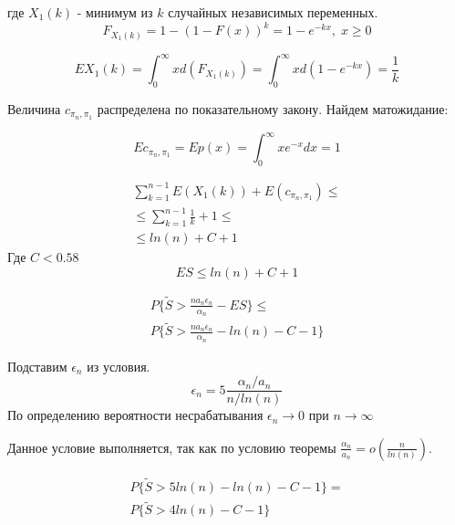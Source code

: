 \documentclass[a4paper, 14pt]{extarticle}
\numberwithin{equation}{section}
\begin{document}
где $X_1(k)$ - минимум из $k$ случайных независимых переменных.
\begin{equation}
F_{X_1(k)} = 1 - (1-F(x))^k = 1 - e^{-kx}, \; x \geq 0
\end{equation}

\begin{equation}
EX_1(k) = \int_0^\infty xd(F_{X_1(k)}) =\int_0^\infty xd(1-e^{-kx}) = \frac{1}{k}
\end{equation}

Величина $c_{\pi_n, \pi_1}$ распределена по показательному закону. Найдем матожидание:

\begin{equation}
Ec_{\pi_n, \pi_1} = Ep(x) = \int_0^\infty xe^{-x}dx = 1
\end{equation}

\begin{equation}
\begin{aligned}
\sum_{k=1}^{n-1} E(X_1(k)) + E(c_{\pi_n, \pi_1}) \leq \\
 \leq \sum_{k=1}^{n-1} \frac{1}{k} + 1 \leq \\
 \leq ln(n) + C + 1
\end{aligned}
\end{equation}
Где $C < 0.58$
\begin{equation}
ES \leq ln(n) + C + 1
\end{equation}

\begin{equation}
\begin{aligned}
P\{\tilde{S} >\frac{na_n\epsilon_n}{\alpha_n} - ES  \} \leq \\
P\{\tilde{S} >\frac{na_n\epsilon_n}{\alpha_n} - ln(n) - C - 1  \} \end{aligned}
\end{equation}

Подставим $\epsilon_n$ из условия.
\begin{equation}
\epsilon_n = 5 \frac{\alpha_n/a_n}{n/ln(n)}
\end{equation}
По определению вероятности несрабатывания $\epsilon_n \rightarrow 0$ при $n \rightarrow \infty$

Данное условие выполняется, так как по условию теоремы $\frac{\alpha_n}{a_n} = o(\frac{n}{ln(n)})$.

\begin{equation}
\begin{aligned}
P\{\tilde{S} >5ln(n) - ln(n) - C - 1  \} = \\
P\{\tilde{S} >4ln(n) - C - 1  \}
\end{aligned}
\end{equation}
\end{document}
